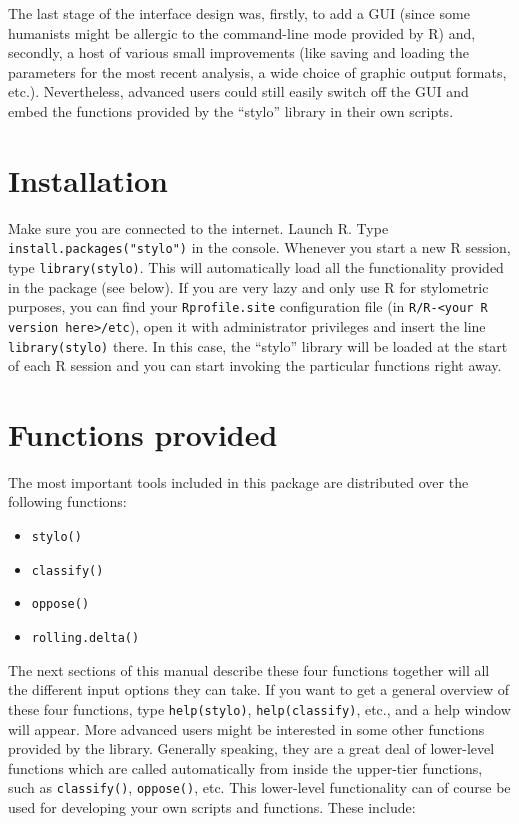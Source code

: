 \documentclass[11pt,a4paper]{article}
\def\code#1{{\tt #1}}
\begin{document}
The last stage of the interface design was, firstly, to add a GUI
(since some humanists might be allergic to the command-line mode provided
by R) and, secondly, a host of various small improvements (like saving
and loading the parameters for the most recent analysis, a wide choice
of graphic output formats, etc.). Nevertheless, advanced users could
still easily switch off the GUI and embed the functions provided by
the ``stylo'' library in their own scripts.


\section{Installation}

Make sure you are connected to the internet. Launch R. Type \code{install.packages("stylo")}
in the console. Whenever you start a new R session, type \code{library(stylo)}.
This will automatically load all the functionality provided in the
package (see below). If you are very lazy and only use R for stylometric
purposes, you can find your \code{Rprofile.site} configuration file 
(in \code{R/R-<your R version here>/etc}), open it with administrator privileges
and insert the line \code{library(stylo)} there. In this case, the
``stylo'' library will be loaded at the start of each R session and you
can start invoking the particular functions right away.


\section{Functions provided}

The most important tools included in this package are distributed
over the following functions:

\begin{itemize}
  \item \code{stylo()}
  \item \code{classify()} 
  \item \code{oppose()} 
  \item \code{rolling.delta()} 
\end{itemize}

The next sections of this manual describe these four functions together
will all the different input options they can take. If you want to
get a general overview of these four functions, type \code{help(stylo)},
\code{help(classify)}, etc., and a help window will appear. More
advanced users might be interested in some other functions
provided by the library. Generally speaking, they are a great deal
of lower-level functions which are called automatically from inside
the upper-tier functions, such as \code{classify()}, \code{oppose()},
etc. This lower-level functionality can of course be used for developing
your own scripts and functions. These include:
\end{document}
